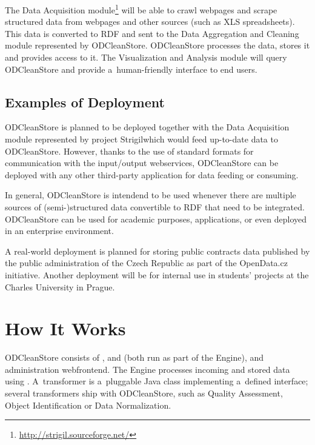 
The Data Acquisition module\footnote{\url{http://strigil.sourceforge.net/}} will be able to crawl webpages and scrape structured data from webpages and other sources (such as XLS spreadsheets). This data is converted to RDF and sent to the Data Aggregation and Cleaning module represented by ODCleanStore. ODCleanStore processes the data, stores it and provides access to it. The Visualization and Analysis module will query ODCleanStore and provide a~human-friendly interface to end users.


\section{Examples of Deployment}

ODCleanStore is planned to be deployed together with the Data Acquisition module represented by project Strigil\footnotemark[\thefootnote] which would feed up-to-date data to ODCleanStore. However, thanks to the use of standard formats for communication with the input/output webservices, ODCleanStore can be deployed with any other third-party application for data feeding or consuming.

In general, ODCleanStore is intendend to be used whenever there are multiple sources of (semi-)structured data convertible to RDF that need to be integrated. ODCleanStore can be used for academic purposes,  applications, or even deployed in an enterprise environment.

A real-world deployment is planned for storing public contracts data published by the public administration of the Czech Republic as part of the OpenData.cz initiative. Another deployment will be for internal use in students' projects at the Charles University in Prague.


\chapter{How It Works}
\label{chap:howItWorks}

ODCleanStore consists of ,  and  (both run as part of the Engine), and administration webfrontend. The Engine processes incoming and stored data using . A~transformer is a~pluggable Java class implementing a~defined interface; several transformers ship with ODCleanStore, such as Quality Assessment, Object Identification or Data Normalization.


